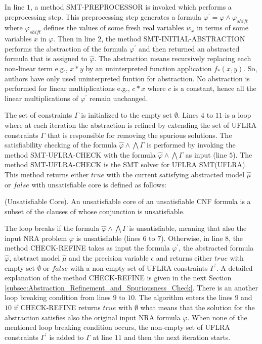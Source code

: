 \noindent In line $1$, a method SMT-PREPROCESSOR is invoked which performs a preprocessing step.
This preprocessing step generates  a formula $\varphi^{\prime} = \varphi \wedge \varphi_{shift}$ where $\varphi_{shift}$ defines the values of some fresh real variables $w_{x}$ in terms of some variables $x$ in $\varphi$.
Then in line $2$, the method SMT-INITIAL-ABSTRACTION performs the abstraction of the formula $\varphi^{\prime}$ and then returned an abstracted formula that is assigned to $\hat{\varphi}$.
The abstraction means recursively replacing each non-linear term e.g., $x \ast y$ by an uninterpreted function application $f_{\ast}(x, y)$.
So, authors have only used uninterpreted funtion for abstraction.
No abstraction is performed for linear multiplications e.g., $c \ast x$ where $c$ is a constant, hence all the linear multiplications of $\varphi^{\prime}$ remain unchanged.\newline

\noindent The set of constraints $\Gamma$ is initialized to the empty set $\emptyset$.
Lines $4$ to $11$ is a loop where at each iteration the abstraction is refined by extending the set of UFLRA constraints $\Gamma$ that is responsible for removing the spurious solutions.
The satisfiability checking of the formula $\hat{\varphi} \wedge \bigwedge \Gamma$ is performed by invoking the method SMT-UFLRA-CHECK with the formula $\hat{\varphi} \wedge \bigwedge \Gamma$ as input (line $5$).
The method SMT-UFLRA-CHECK is the SMT solver for UFLRA SMT(UFLRA).
This method returns either $true$ with the current satisfying abstracted model $\hat{\mu}$ or $false$ with unsatisfiable core is defined as follows:\newline

\begin{definition}
    (Unsatisfiable Core).
    An unsatisfiable core of an unsatisfiable CNF formula is a subset of the clauses of whose conjunction is unsatisfiable.
 \end{definition}

\noindent The loop breaks if the formula $\hat{\varphi} \wedge \bigwedge \Gamma$ is unsatisfiable, meaning that also the input NRA problem $\varphi$ is unsatisfiable (lines $6$ to $7$).
Otherwise, in line $8$, the method CHECK-REFINE takes as input the formula $\varphi^{\prime}$, the abstracted formula $\hat{\varphi}$, abstract model $\hat{\mu}$ and the precision variable $\epsilon$ and returns either $true$ with empty set $\emptyset$ or $false$ with a non-empty set of UFLRA constraints $\Gamma^{\prime}$.
A detailed explanation of the method CHECK-REFINE is given in the next Section \ref{subsec:Abstraction_Refinement_and_Spuriousness_Check}. 
There is an another loop breaking condition from lines $9$ to $10$.
The algorithm enters the lines $9$ and $10$ if CHECK-REFINE returns $true$ with $\emptyset$ what means that the solution for the abstraction satisfies also the original input NRA formula $\varphi$.
When none of the mentioned loop breaking condition occurs, the non-empty set of UFLRA constraints $\Gamma^{\prime}$ is added to $\Gamma$ at line $11$ and then the next iteration starts.
